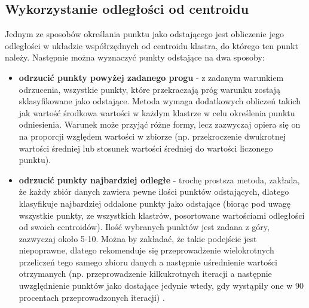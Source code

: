 \documentclass[eng,printmode]{mgr}
\begin{document}
\subsection{Wykorzystanie odległości od centroidu}
Jednym ze sposobów określania punktu jako odstającego jest obliczenie jego odległości w układzie współrzędnych od centroidu klastra, do którego ten punkt należy. Następnie można wyznaczyć punkty odstające na dwa sposoby:
\begin{itemize}
\item \textbf{odrzucić punkty powyżej zadanego progu} - z zadanym warunkiem odrzucenia, wszystkie punkty, które przekraczają próg warunku zostają sklasyfikowane jako odstające. Metoda wymaga dodatkowych obliczeń takich jak wartość środkowa wartości w każdym klastrze w celu określenia punktu odniesienia. Warunek może przyjąć różne formy, lecz zazwyczaj opiera się on na proporcji względem wartości w zbiorze (np. przekroczenie dwukrotnej wartości średniej lub stosunek wartości średniej do wartości liczonego punktu).
\item \textbf{odrzucić punkty najbardziej odległe} - trochę prostsza metoda, zakłada, że każdy zbiór danych zawiera pewne ilości punktów odstających, dlatego klasyfikuje najbardziej oddalone punkty jako odstające (biorąc pod uwagę wszystkie punkty, ze wszystkich klastrów, posortowane wartościami odległości od swoich centroidów). Ilość wybranych punktów jest zadana z góry, zazwyczaj około 5-10. Można by zakładać, że takie podejście jest niepoprawne, dlatego rekomenduje się przeprowadzenie wielokrotnych przeliczeń tego samego zbioru danych a następnie uśrednienie wartości otrzymanych (np. przeprowadzenie kilkukrotnych iteracji a następnie uwzględnienie punktów jako dostające jedynie wtedy, gdy wystąpiły one w 90 procentach przeprowadzonych iteracji)  \cite{kmean_dist}. 
\end{itemize}
\end{document}
